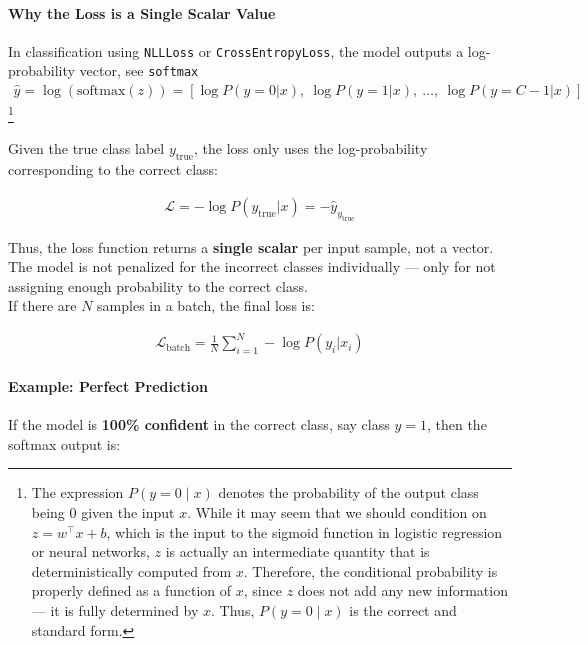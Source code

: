 \paragraph{Why the Loss is a Single Scalar Value}

In classification using \texttt{NLLLoss} or \texttt{CrossEntropyLoss}, the model outputs a log-probability vector, see \texttt{softmax}\begin{align}
	\hat{y} = \log \left( \text{softmax}(z) \right)
	= [\log P(y=0|x),\ \log P(y=1|x),\ \dots,\ \log P(y=C-1|x)]
\end{align} \footnote{
The expression $P(y = 0 \mid x)$ denotes the probability of the output class being 0 given the input $x$. While it may seem that we should condition on $z = w^\top x + b$, which is the input to the sigmoid function in logistic regression or neural networks, $z$ is actually an intermediate quantity that is deterministically computed from $x$. Therefore, the conditional probability is properly defined as a function of $x$, since $z$ does not add any new information — it is fully determined by $x$. Thus, $P(y = 0 \mid x)$ is the correct and standard form.
}

Given the true class label $y_{\text{true}}$, the loss only uses the log-probability corresponding to the correct class:

\begin{align}
	\mathcal{L} = -\log P(y_{\text{true}} | x) = -\hat{y}_{y_{\text{true}}}
\end{align}

Thus, the loss function returns a \textbf{single scalar} per input sample, not a vector. The model is not penalized for the incorrect classes individually — only for not assigning enough probability to the correct class.\\

If there are $N$ samples in a batch, the final loss is:

\begin{align}
	\mathcal{L}_{\text{batch}} = \frac{1}{N} \sum_{i=1}^{N} -\log P(y_i | x_i)
\end{align}

\paragraph{Example: Perfect Prediction}

If the model is \textbf{100\% confident} in the correct class, say class $y=1$, then the softmax output is:

